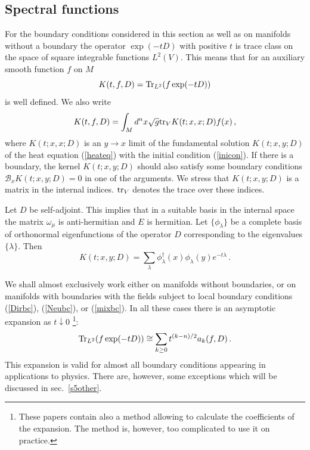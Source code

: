\subsection{Spectral functions}\label{s2spec}
For the boundary conditions considered in this section as well
as on manifolds without a boundary the operator 
$\exp (-tD)$ with positive $t$ is trace class on the space
of square integrable functions $L^2(V)$. This means that for
an auxiliary smooth function $f$ on $M$ 
\begin{equation}
K(t,f,D)={\rm Tr}_{L^2}(f\exp (-tD)) 
\label{heatTr}
\end{equation}
is well defined. We also write
\begin{equation}
K(t,f,D)=\int_M d^nx \sqrt{g} {\rm tr}_V K(t;x,x;D) f(x) \,,\label{KxxD}
\end{equation}
where $K(t;x,x;D)$ is an $y\to x$ limit of the fundamental
solution
$K(t;x,y;D)$ of the heat equation (\ref{heateq})
with the initial condition (\ref{inicon}).
If there is a boundary, the kernel $K(t;x,y;D)$ should also
satisfy some boundary conditions $\mathcal{B}_xK(t;x,y;D)=0$
in one of the arguments. We stress that $K(t;x,y;D)$ is a matrix
in the internal indices. ${\rm tr}_V$ denotes the trace over these indices.

Let $D$ be self-adjoint. This implies that in a suitable basis in the
internal space the matrix $\omega_\mu$ is anti-hermitian and $E$ is
hermitian. Let $\{ \phi_\lambda \}$ be a complete basis of orthonormal
eigenfunctions of the operator $D$ corresponding to the eigenvalues
$\{\lambda\}$. Then
\begin{equation}
K(t;x,y;D)=\sum_\lambda \phi^\dag_\lambda (x)\phi_\lambda (y)
e^{-t\lambda} \,.\label{hkeigen}
\end{equation}

We shall almost exclusively work either on manifolds without boundaries, or
on manifolds with boundaries with the fields subject to local boundary
conditions (\ref{Dirbc}), (\ref{Neubc}), or (\ref{mixbc}). In all these
cases there is
an asymptotic expansion as $t\downarrow 0$ 
\cite{Seeley:1966,Seeley:1969,Greiner:1971}\footnote{These papers contain
also a method allowing to calculate the coefficients of the expansion.
The method is, however, too complicated to use it on practice.
}:
\begin{equation}
{\rm Tr}_{L^2} (f\exp (-tD)) 
\cong\sum_{k\ge0}t^{(k-n)/2}a_k(f,D)\,.
\label{asymptotex}
\end{equation}
This expansion is valid for almost all boundary conditions appearing
in applications to physics. There are, however, some exceptions which
will be discussed in sec.\ \ref{s5other}.

